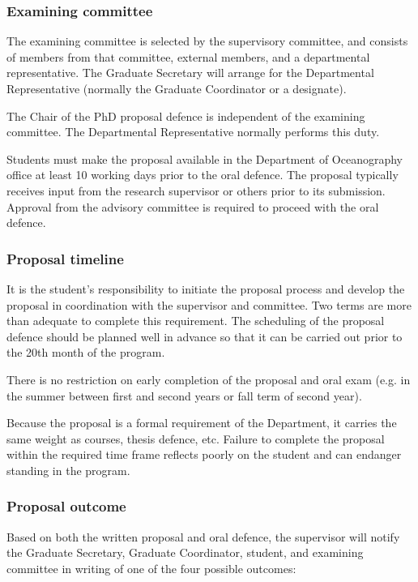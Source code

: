 \documentclass{article}
\begin{document}
\subsubsection{Examining committee}

The examining committee is selected by the supervisory committee, and consists
of members from that committee, external members, and a departmental
representative. The Graduate Secretary will arrange for the Departmental
Representative (normally the Graduate Coordinator or a designate).

The Chair of the PhD proposal defence is independent of the examining
committee. The Departmental Representative normally performs this duty.

Students must make the proposal available in the Department of Oceanography
office at least 10 working days prior to the oral defence.  The proposal
typically receives input from the research supervisor or others prior to its
submission. Approval from the advisory committee is required to proceed with
the oral defence.

\subsubsection{Proposal timeline}

It is the student's responsibility to initiate the proposal process and develop
the proposal in coordination with the supervisor and committee. Two terms are
more than adequate to complete this requirement. The scheduling of the proposal
defence should be planned well in advance so that it can be carried out prior
to the 20th month of the program.

There is no restriction on early completion of the proposal and oral exam (e.g.
in the summer between first and second years or fall term of second year).

Because the proposal is a formal requirement of the Department, it carries the
same weight as courses, thesis defence, etc. Failure to complete the proposal
within the required time frame reflects poorly on the student and can endanger
standing in the program.


\subsubsection{Proposal outcome}

Based on both the written proposal and oral defence, the supervisor will notify
the Graduate Secretary, Graduate Coordinator, student, and examining committee
in writing of one of the four possible outcomes:
\end{document}
